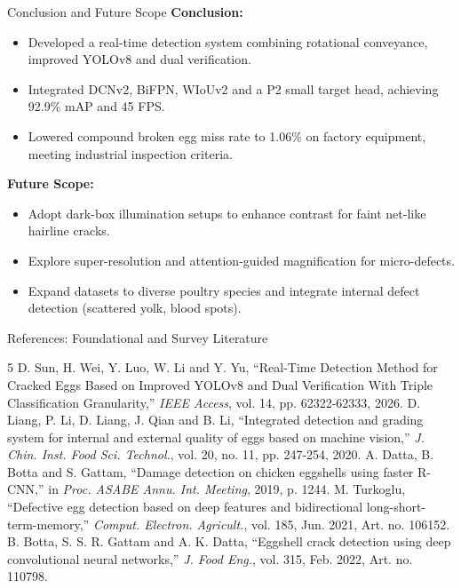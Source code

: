 \documentclass{beamer}
\begin{document}
\begin{frame}{Conclusion and Future Scope}
\small
\textbf{Conclusion:}
\begin{itemize}
    \item Developed a real-time detection system combining rotational conveyance, improved YOLOv8 and dual verification.
    \item Integrated DCNv2, BiFPN, WIoUv2 and a P2 small target head, achieving 92.9\% mAP and 45 FPS.
    \item Lowered compound broken egg miss rate to 1.06\% on factory equipment, meeting industrial inspection criteria.
\end{itemize}
\bigskip
\textbf{Future Scope:}
\begin{itemize}
    \item Adopt dark-box illumination setups to enhance contrast for faint net-like hairline cracks.
    \item Explore super-resolution and attention-guided magnification for micro-defects.
    \item Expand datasets to diverse poultry species and integrate internal defect detection (scattered yolk, blood spots).
\end{itemize}
\end{frame}

\begin{frame}{References: Foundational and Survey Literature}
\scriptsize
\begin{thebibliography}{5}
 D. Sun, H. Wei, Y. Luo, W. Li and Y. Yu, ``Real-Time Detection Method for Cracked Eggs Based on Improved YOLOv8 and Dual Verification With Triple Classification Granularity,'' \textit{IEEE Access}, vol. 14, pp. 62322-62333, 2026.
 D. Liang, P. Li, D. Liang, J. Qian and B. Li, ``Integrated detection and grading system for internal and external quality of eggs based on machine vision,'' \textit{J. Chin. Inst. Food Sci. Technol.}, vol. 20, no. 11, pp. 247-254, 2020.
 A. Datta, B. Botta and S. Gattam, ``Damage detection on chicken eggshells using faster R-CNN,'' in \textit{Proc. ASABE Annu. Int. Meeting}, 2019, p. 1244.
 M. Turkoglu, ``Defective egg detection based on deep features and bidirectional long-short-term-memory,'' \textit{Comput. Electron. Agricult.}, vol. 185, Jun. 2021, Art. no. 106152.
 B. Botta, S. S. R. Gattam and A. K. Datta, ``Eggshell crack detection using deep convolutional neural networks,'' \textit{J. Food Eng.}, vol. 315, Feb. 2022, Art. no. 110798.
\end{thebibliography}
\end{frame}
\end{document}
